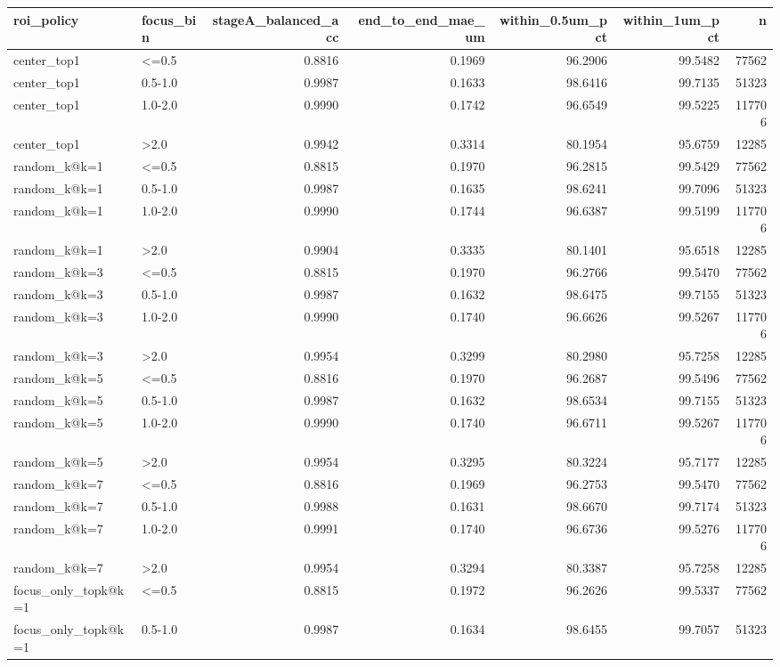 \begin{tabular}{llrrrrr}
\toprule
roi_policy & focus_bin & stageA_balanced_acc & end_to_end_mae_um & within_0.5um_pct & within_1um_pct & n \\
\midrule
center_top1 & <=0.5 & 0.8816 & 0.1969 & 96.2906 & 99.5482 & 77562 \\
center_top1 & 0.5-1.0 & 0.9987 & 0.1633 & 98.6416 & 99.7135 & 51323 \\
center_top1 & 1.0-2.0 & 0.9990 & 0.1742 & 96.6549 & 99.5225 & 117706 \\
center_top1 & >2.0 & 0.9942 & 0.3314 & 80.1954 & 95.6759 & 12285 \\
random_k@k=1 & <=0.5 & 0.8815 & 0.1970 & 96.2815 & 99.5429 & 77562 \\
random_k@k=1 & 0.5-1.0 & 0.9987 & 0.1635 & 98.6241 & 99.7096 & 51323 \\
random_k@k=1 & 1.0-2.0 & 0.9990 & 0.1744 & 96.6387 & 99.5199 & 117706 \\
random_k@k=1 & >2.0 & 0.9904 & 0.3335 & 80.1401 & 95.6518 & 12285 \\
random_k@k=3 & <=0.5 & 0.8815 & 0.1970 & 96.2766 & 99.5470 & 77562 \\
random_k@k=3 & 0.5-1.0 & 0.9987 & 0.1632 & 98.6475 & 99.7155 & 51323 \\
random_k@k=3 & 1.0-2.0 & 0.9990 & 0.1740 & 96.6626 & 99.5267 & 117706 \\
random_k@k=3 & >2.0 & 0.9954 & 0.3299 & 80.2980 & 95.7258 & 12285 \\
random_k@k=5 & <=0.5 & 0.8816 & 0.1970 & 96.2687 & 99.5496 & 77562 \\
random_k@k=5 & 0.5-1.0 & 0.9987 & 0.1632 & 98.6534 & 99.7155 & 51323 \\
random_k@k=5 & 1.0-2.0 & 0.9990 & 0.1740 & 96.6711 & 99.5267 & 117706 \\
random_k@k=5 & >2.0 & 0.9954 & 0.3295 & 80.3224 & 95.7177 & 12285 \\
random_k@k=7 & <=0.5 & 0.8816 & 0.1969 & 96.2753 & 99.5470 & 77562 \\
random_k@k=7 & 0.5-1.0 & 0.9988 & 0.1631 & 98.6670 & 99.7174 & 51323 \\
random_k@k=7 & 1.0-2.0 & 0.9991 & 0.1740 & 96.6736 & 99.5276 & 117706 \\
random_k@k=7 & >2.0 & 0.9954 & 0.3294 & 80.3387 & 95.7258 & 12285 \\
focus_only_topk@k=1 & <=0.5 & 0.8815 & 0.1972 & 96.2626 & 99.5337 & 77562 \\
focus_only_topk@k=1 & 0.5-1.0 & 0.9987 & 0.1634 & 98.6455 & 99.7057 & 51323 \\

\end{tabular}
